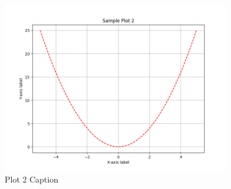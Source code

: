 \documentclass[class=book, crop=false]{standalone}
\begin{document}
\paragraph*{}
\blindmathpaper

\cite{latex2e}

\begin{figure}[htbp]
    \centering
    \includegraphics[width=10cm]{../../figures_and_plots/plots/plot2.png}
    \caption{Plot 2 Caption}
    \label{fig:plot2}
\end{figure}
\end{document}
